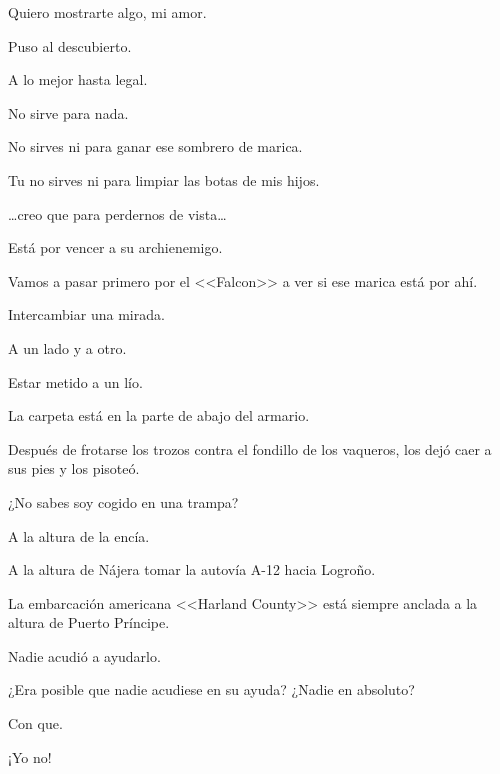 \sk
Quiero mostrarte algo, mi amor. \nb{}

\sk
Puso al descubierto. 

\sk
A lo mejor hasta legal. 

\sk
No sirve para nada. 

\sk
No sirves ni para ganar ese sombrero de marica. \nb{}

\sk
Tu no sirves ni para limpiar las botas de mis hijos. 

\sk
\ldots{}creo que para perdernos de vista\ldots{} 

\sk
Está por vencer a su archienemigo. 

\sk
Vamos a pasar primero por el <<Falcon>> a ver si ese marica está por ahí. \nb{}

\sk
Intercambiar una mirada. 

\sk
A un lado y a otro. 

\sk
Estar metido a un lío. 

\sk
La carpeta está en la parte de abajo del armario. \nb{}

\sk
Después de frotarse los trozos contra el fondillo de los vaqueros, los dejó caer a sus pies y los pisoteó. 

\sk
¿No sabes soy cogido en una trampa? 

\sk
A la altura de la encía. 

\sk
A la altura de Nájera tomar la autovía A-12 hacia Logroño. 

\sk
La embarcación americana <<Harland County>> está siempre anclada a la altura de Puerto Príncipe. 

\sk
Nadie acudió a ayudarlo. 

\sk
¿Era posible que nadie acudiese en su ayuda? ¿Nadie en absoluto? 

\sk
Con que. 

\sk
¡Yo no! 


